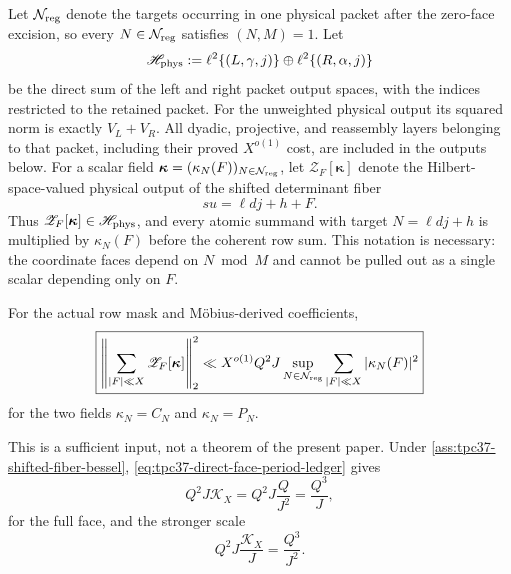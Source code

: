 Let \(\mathcal N_{\rm reg}\) denote the targets occurring in one physical
packet after the zero-face excision, so every
\(N\in\mathcal N_{\rm reg}\) satisfies \((N,M)=1\).  Let
\begin{equation}
 \mathscr H_{\rm phys}
 :=\ell^2\{(L,\gamma,j)\}
   \oplus\ell^2\{(R,\alpha,j)\}
 \label{eq:tpc37-physical-output-Hilbert-space}
\end{equation}
be the direct sum of the left and right packet output spaces, with the
indices restricted to the retained packet.  For the unweighted physical
output its squared norm is exactly \(V_L+V_R\).  All dyadic, projective,
and reassembly layers belonging to that packet, including their proved
\(X^{o(1)}\) cost, are included in the outputs below.
For a scalar field
\(\boldsymbol\kappa=(\kappa_N(F))_{N\in\mathcal N_{\rm reg}}\), let
\(\mathscr Z_F[\boldsymbol\kappa]\) denote the Hilbert-space-valued
physical output of the shifted determinant fiber
\begin{equation}
 su=\ell dj+h+F.
 \label{eq:tpc37-shifted-determinant-fiber}
\end{equation}
Thus \(\mathscr Z_F[\boldsymbol\kappa]\in\mathscr H_{\rm phys}\), and
every atomic summand with target \(N=\ell dj+h\) is multiplied by
\(\kappa_N(F)\) before the coherent row sum.  This notation is necessary:
the coordinate faces depend on \(N\bmod M\) and cannot be pulled out as a
single scalar depending only on \(F\).

\begin{assumption}
\label{ass:tpc37-shifted-fiber-bessel}
For the actual row mask and M\"obius-derived coefficients,
\begin{equation}
 \boxed{
 \left\|\sum_{|F|\ll X}
 \mathscr Z_F[\boldsymbol\kappa]\right\|_2^2
 \ll X^{o(1)}Q^2J
 \sup_{N\in\mathcal N_{\rm reg}}
 \sum_{|F|\ll X}|\kappa_N(F)|^2}
 \label{eq:tpc37-shift-fiber-bessel-gate}
\end{equation}
for the two fields \(\kappa_N=C_N\) and \(\kappa_N=P_N\).
\end{assumption}

This is a sufficient input, not a theorem of the present paper.  Under
\cref{ass:tpc37-shifted-fiber-bessel},
\eqref{eq:tpc37-direct-face-period-ledger} gives
\begin{equation}
 Q^2J\mathcal K_X
 =Q^2J\frac Q{J^2}
 =\frac{Q^3}{J},
 \label{eq:tpc37-full-face-bessel-ledger}
\end{equation}
for the full face, and the stronger scale
\begin{equation}
 Q^2J\frac{\mathcal K_X}{J}
 =\frac{Q^3}{J^2}.
 \label{eq:tpc37-proper-face-bessel-ledger}
\end{equation}

